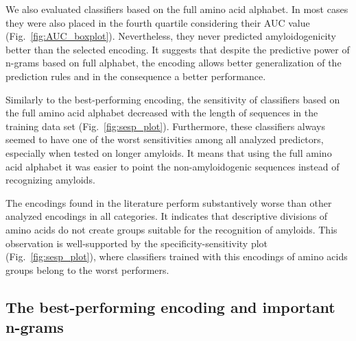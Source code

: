 \documentclass[a4,center,fleqn]{NAR}
\begin{document}
  We also evaluated classifiers based on the full amino acid alphabet. In most 
cases they were also placed in the fourth quartile considering their AUC value 
(Fig.~\ref{fig:AUC_boxplot}). Nevertheless, they never predicted 
amyloidogenicity better than the selected encoding. It suggests that despite the 
predictive power of n-grams based on full alphabet, the encoding allows better 
generalization of the prediction rules and in the consequence a better 
performance.

  Similarly to the best-performing encoding, the sensitivity of classifiers 
based on the full amino acid alphabet decreased with the length of sequences in 
the training data set (Fig.~\ref{fig:sesp_plot}). Furthermore, these classifiers 
always seemed to  have one of the worst sensitivities among all analyzed 
predictors, especially when tested on longer amyloids. It means that using the 
full amino acid alphabet it was easier to point the non-amyloidogenic sequences 
instead of recognizing amyloids.

  The encodings found in the literature perform substantively worse than other 
analyzed encodings in all categories. It indicates that descriptive divisions of 
amino acids do not create groups suitable for the recognition of amyloids. This 
observation is well-supported by the specificity-sensitivity plot 
(Fig.~\ref{fig:sesp_plot}), where classifiers trained with this encodings of 
amino acids groups belong to the worst performers.

\subsection{The best-performing encoding and important n-grams}
\end{document}
